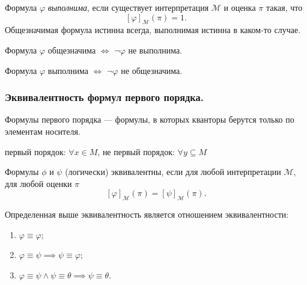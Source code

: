 \documentclass[a4paper, fleqn]{article}
\begin{document}
    \begin{definition}
        Формула $\varphi$ {\it выполнима}, если существует интерпретация $\mathcal{M}$ 
        и оценка $\pi$ такая, что
        $$
            [\varphi]_{\mathcal{M}}(\pi) = 1.
        $$
        Общезначимая формула истинна всегда, выполнимая истинна в каком-то случае.
    \end{definition}

    \begin{lemma}
        Формула $\varphi$ общезначима $\iff$ $\neg \varphi$ не выполнима.
    \end{lemma}

    \begin{lemma}
        Формула $\varphi$ выполнима $\iff$ $\neg \varphi$ не общезначима.
    \end{lemma}

    \subsubsection{Эквивалентность формул первого порядка.}

    Формулы первого порядка --- формулы, в которых кванторы берутся только по элементам 
    носителя.
    \begin{example}
        первый порядок: $\forall x \in M$, 
        не первый порядок: $\forall y \subseteq M$
    \end{example}

    \begin{definition}
        Формулы $\phi$ и $\psi$ (логически) эквивалентны, если для любой интерпретации
        $\mathcal{M}$, для любой оценки $\pi$
        $$
            [\varphi]_{\mathcal{M}}(\pi) = [\psi]_{\mathcal{M}}(\pi).
        $$
    \end{definition}

    \begin{lemma}
        Определенная выше эквивалентность является отношением эквивалентности:
        \begin{enumerate}[topsep=0pt]
            \item $\varphi \equiv \varphi$;
            \item $\varphi \equiv \psi \implies \psi \equiv \varphi$;
            \item $\varphi \equiv \psi \land \psi \equiv \theta \implies \psi \equiv \theta$.
        \end{enumerate}
    \end{lemma}
\end{document}

